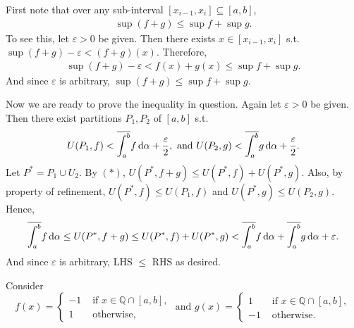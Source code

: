 \documentclass[12pt]{article}
\begin{document}
\begin{fproof}[1(b)]
    First note that over any sub-interval \([x_{i-1},x_i] \subseteq [a,b]\), 
    \begin{align*}
        \sup (f+g) \leq \sup f + \sup g. \tag{\(\ast\)}
    \end{align*}
    To see this, let \(\varepsilon > 0\) be given.
    Then there exists \(x \in [x_{i-1}, x_i]\) s.t. \(\sup(f + g) - \varepsilon < (f+g)(x)\).
    Therefore,
    \begin{align*}
        \sup(f + g) - \varepsilon < f(x) + g(x) \leq \sup f + \sup g.
    \end{align*}
    And since \(\varepsilon\) is arbitrary, \(\sup(f+g) \leq \sup f + \sup g\).

    Now we are ready to prove the inequality in question.
    Again let \(\varepsilon > 0\) be given. 
    Then there exist partitions \(P_1, P_2\) of \([a,b]\) s.t.
    \begin{align*}
        U(P_1, f) < \overline{\int_{a}^{b}} f \mathop{}\!\mathrm{d}\alpha + \frac{\varepsilon}{2}, \text{ and } U(P_2, g) < \overline{\int_{a}^{b}} g \mathop{}\!\mathrm{d}\alpha + \frac{\varepsilon}{2}. 
    \end{align*}
    Let \(P^* = P_1 \cup U_2\).
    By \((\ast)\), \(U(P^*, f+g) \leq U(P^*, f) + U(P^*, g)\).
    Also, by property of refinement, \(U(P^*,f) \leq U(P_1, f)\) and \(U(P^*, g) \leq U(P_2, g)\).
    Hence,
    \begin{align*}
        \overline{\int_{a}^{b}} f \mathop{}\!\mathrm{d}\alpha \leq U(P^*, f+g) \leq U(P^*,f) + U(P^*,g) < \overline{\int_{a}^{b}} f \mathop{}\!\mathrm{d}\alpha + \overline{\int_{a}^{b}} g \mathop{}\!\mathrm{d}\alpha + \varepsilon.
    \end{align*}
    And since \(\varepsilon\) is arbitrary, LHS \(\leq\) RHS as desired.

\end{fproof}

\begin{fproof}[1(c)]
    Consider
    \[
    f(x) = \begin{cases}
        -1 &\text{ if } x \in \mathbb{Q} \cap [a,b],\\
        1 &\text{ otherwise,}
    \end{cases}
    \text{ and }
    g(x) = \begin{cases}
        1 &\text{ if } x \in \mathbb{Q} \cap [a,b],\\
        -1 &\text{ otherwise.}
    \end{cases}
    \]
\end{fproof}
\newpage
\end{document}
